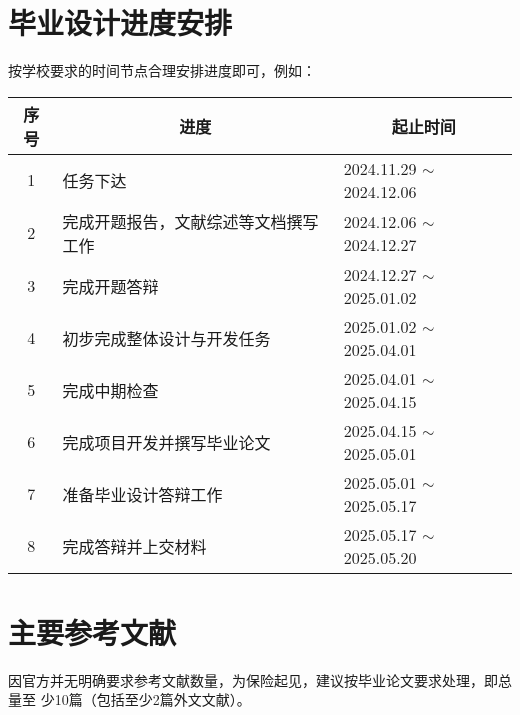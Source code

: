 \section{毕业设计进度安排}

\begin{tcolorbox}
    按学校要求的时间节点合理安排进度即可，例如：
\end{tcolorbox}

\begin{table}[!htbp]
    \centering
    \vspace{-2ex}
    \small%
    \begin{tabular}{cp{25em}p{10.5em}}
        \toprule
        \textbf{序号} & \multicolumn{1}{c}{\textbf{进度}} & \multicolumn{1}{c}{\textbf{起止时间}} \\
        \midrule
        1           & 任务下达                            & 2024.11.29 $\sim$ 2024.12.06      \\
        2           & 完成开题报告，文献综述等文档撰写工作              & 2024.12.06 $\sim$ 2024.12.27      \\
        3           & 完成开题答辩                          & 2024.12.27 $\sim$ 2025.01.02      \\
        4           & 初步完成整体设计与开发任务                   & 2025.01.02 $\sim$ 2025.04.01      \\
        5           & 完成中期检查                          & 2025.04.01 $\sim$ 2025.04.15      \\     
        6           & 完成项目开发并撰写毕业论文                   & 2025.04.15 $\sim$ 2025.05.01      \\     
        7           & 准备毕业设计答辩工作                      & 2025.05.01 $\sim$ 2025.05.17      \\     
        8           & 完成答辩并上交材料                       & 2025.05.17 $\sim$ 2025.05.20      \\
        \bottomrule
    \end{tabular}
    \vspace{-2ex}
\end{table}

\section{主要参考文献}

\begin{tcolorbox}
    因官方并无明确要求参考文献数量，为保险起见，建议按毕业论文要求处理，即总量至
    少10篇（包括至少2篇外文文献）。
\end{tcolorbox}

